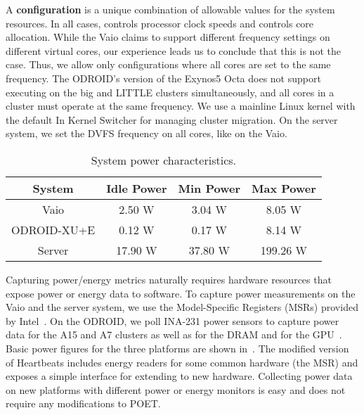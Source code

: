 A \textbf{configuration} is a unique combination of allowable values for the system resources.
In all cases,  controls processor clock speeds and  controls core allocation.
While the Vaio claims to support different frequency settings on different virtual cores, our experience leads us to conclude that this is not the case.
Thus, we allow only configurations where all cores are set to the same frequency.
The ODROID's version of the Exynos5 Octa does not support executing on the big and LITTLE clusters simultaneously, and all cores in a cluster must operate at the same frequency.
We use a mainline Linux kernel with the default In Kernel Switcher for managing cluster migration.
On the server system, we set the DVFS frequency on all cores, like on the Vaio.

\begin{table}[t]
\centering
\caption{System power characteristics.}
\begin{tabular}{cccc}
  \textbf{System} & \textbf{Idle Power} & \textbf{Min Power} & \textbf{Max Power} \\
  \hline
  \hline
  Vaio        & 2.50 W  & 3.04 W  & 8.05 W \\
  ODROID-XU+E & 0.12 W  & 0.17 W  & 8.14 W \\
  Server      & 17.90 W & 37.80 W & 199.26 W \\
  \hline
  \hline
\end{tabular}
\label{tbl:poet-power}
\end{table}

Capturing power/energy metrics naturally requires hardware resources that expose power or energy data to software.
To capture power measurements on the Vaio and the server system, we use the Model-Specific Registers (MSRs) provided by Intel~\cite{SandyBridge}.
On the ODROID, we poll INA-231 power sensors to capture power data for the A15 and A7 clusters as well as for the DRAM and for the GPU~\cite{ina231}.
Basic power figures for the three platforms are shown in~.
The modified version of Heartbeats includes energy readers for some common hardware (\eg the MSR) and exposes a simple interface for extending to new hardware.
Collecting power data on new platforms with different power or energy monitors is easy and does not require any modifications to POET.

